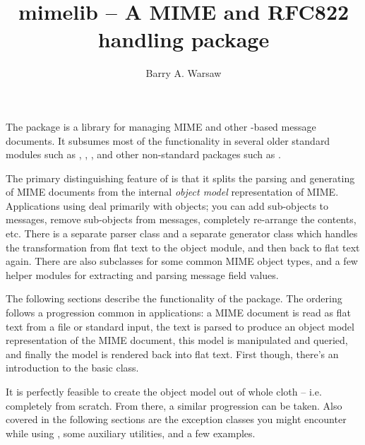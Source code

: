 \documentclass{howto}
\title{mimelib -- A MIME and RFC822 handling package}
\author{Barry A. Warsaw}
\begin{document}
\maketitle



The  package is a library for managing MIME and other
-based message documents.  It subsumes most of the functionality
in several older standard modules such as ,
, , and other non-standard packages such
as .

The primary distinguishing feature of  is that it
splits the parsing and generating of MIME documents from the internal
\emph{object model} representation of MIME.  Applications
using  deal primarily with objects; you can add
sub-objects to messages, remove sub-objects from messages, completely
re-arrange the contents, etc.  There is a separate parser class and a
separate generator class which handles the transformation from flat
text to the object module, and then back to flat text again.  There
are also subclasses for some common MIME object types, and a few
helper modules for extracting and parsing message field values.

The following sections describe the functionality of the
 package.  The ordering follows a progression common
in applications: a MIME document is read as flat text from a file or
standard input, the text is parsed to produce an object model
representation of the MIME document, this model is manipulated and
queried, and finally the model is rendered back into flat text.  First
though, there's an introduction to the basic
 class.

It is perfectly feasible to create the object model out of whole cloth
-- i.e. completely from scratch.  From there, a similar progression can
be taken.  Also covered in the following sections are the exception
classes you might encounter while using , some
auxiliary utilities, and a few examples.
\end{document}
